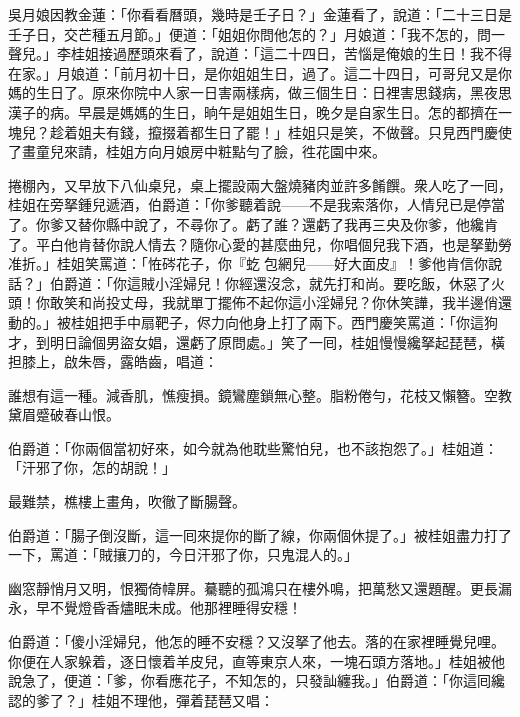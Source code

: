 吳月娘因教金蓮：「你看看曆頭，幾時是壬子日？」金蓮看了，說道：「二十三日是壬子日，交芒種五月節。」便道：「姐姐你問他怎的？」月娘道：「我不怎的，問一聲兒。」李桂姐接過歷頭來看了，說道：「這二十四日，苦惱是俺娘的生日！{}我不得在家。」月娘道：「前月初十日，是你姐姐生日，過了。這二十四日，可哥兒又是你媽的生日了。原來你院中人家一日害兩樣病，做三個生日：日裡害思錢病，黑夜思漢子的病。早晨是媽媽的生日，晌午是姐姐生日，晚夕是自家生日。怎的都擠在一塊兒？趁着姐夫有錢，攛掇着都生日了罷！」桂姐只是笑，不做聲。只見西門慶使了畫童兒來請，桂姐方向月娘房中粧點勻了臉，徃花園中來。

捲棚內，又早放下八仙桌兒，桌上擺設兩大盤燒豬肉並許多餚饌。衆人吃了一囘，桂姐在旁拏鍾兒遞酒，伯爵道：「你爹聽着說——不是我索落你，人情兒已是停當了。你爹又替你縣中說了，不尋你了。虧了誰？還虧了我再三央及你爹，他纔肯了。平白他肯替你說人情去？{}隨你心愛的甚麼曲兒，你唱個兒我下酒，也是拏勤勞准折。」桂姐笑罵道：「恠硶花子，你『虼𧒮包網兒——好大面皮』！爹他肯信你說話？」伯爵道：「你這賊小淫婦兒！你經還沒念，就先打和尚。要吃飯，休惡了火頭！你敢笑和尚投丈母，我就單丁擺佈不起你這小淫婦兒？你休笑譁，我半邊俏還動的。」被桂姐把手中扇靶子，侭力向他身上打了兩下。西門慶笑罵道：「你這狗才，到明日論個男盜女娼，還虧了原問處。」笑了一囘，桂姐慢慢纔拏起琵琶，橫担膝上，啟朱唇，露皓齒，唱道：

\begin{myquote} 
誰想有這一種。減香肌，憔瘦損。鏡鸞塵鎖無心整。脂粉倦勻，花枝又懶簪。空教黛眉蹙破春山恨。
\end{myquote} 

伯爵道：「你兩個當初好來，如今就為他耽些驚怕兒，也不該抱怨了。」桂姐道：「汗邪了你，怎的胡說！」

\begin{myquote} 
最難禁，樵樓上畫角，吹徹了斷腸聲。
\end{myquote} 

伯爵道：「腸子倒沒斷，這一囘來提你的斷了線，你兩個休提了。」被桂姐盡力打了一下，罵道：「賊攘刀的，今日汗邪了你，只鬼混人的。」

\begin{myquote} 
幽窓靜悄月又明，恨獨倚幃屏。驀聽的孤鴻只在樓外鳴，把萬愁又還題醒。更長漏永，早不覺燈昏香燼眠未成。他那裡睡得安穩！
\end{myquote} 

伯爵道：「傻小淫婦兒，他怎的睡不安穩？又沒拏了他去。落的在家裡睡覺兒哩。你便在人家躲着，逐日懷着羊皮兒，直等東京人來，一塊石頭方落地。」桂姐被他說急了，便道：「爹，你看應花子，不知怎的，只發訕纏我。」伯爵道：「你這囘纔認的爹了？」{}桂姐不理他，彈着琵琶又唱：


